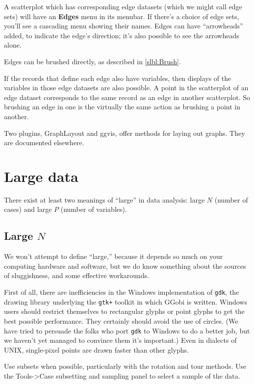 \documentclass[11pt]{article}
\begin{document}
A scatterplot which has corresponding edge datasets (which we might call
edge sets) will have an {\bf Edges} menu in its menubar.  If there's a
choice of edge sets, you'll see a cascading menu showing their names.
Edges can have ``arrowheads'' added, to indicate the edge's direction;
it's also possible to see the arrowheads alone.

Edges can be brushed directly, as described in \ref{slbl:Brush}.

If the records that define each edge also have variables, then
displays of the variables in those edge datasets are also possible.
A point in the scatterplot of an edge dataset corresponds to the
same record as an edge in another scatterplot.  So brushing an
edge in one is the virtually the same action as brushing a point
in another.

Two plugins, GraphLayout and ggvis, offer methods for laying out
graphs.  They are documented elsewhere.

\section{Large data}

There exist at least two meanings of ``large'' in data analysis: large
$N$ (number of cases) and large $P$ (number of variables).  

\subsection{Large $N$}

We won't attempt to define ``large,'' because it depends so much on
your computing hardware and software, but we do know something about
the sources of sluggishness, and some effective workarounds.

First of all, there are inefficiencies in the Windows implementation
of \verb|gdk|, the drawing library underlying the \verb|gtk+| toolkit
in which GGobi is written.  Windows users should restrict themselves to
rectangular glyphs or point glyphs to get the best possible performance.
They certainly should avoid the use of circles.  (We have tried to
persuade the folks who port \verb|gdk| to Windows to do a better job,
but we haven't yet managed to convince them it's important.)  Even in
dialects of UNIX, single-pixel points are drawn faster than other glyphs.

Use subsets when possible, particularly with the rotation and tour
methods.  Use the Tools->Case subsetting and sampling panel to select
a sample of the data.
\end{document}
